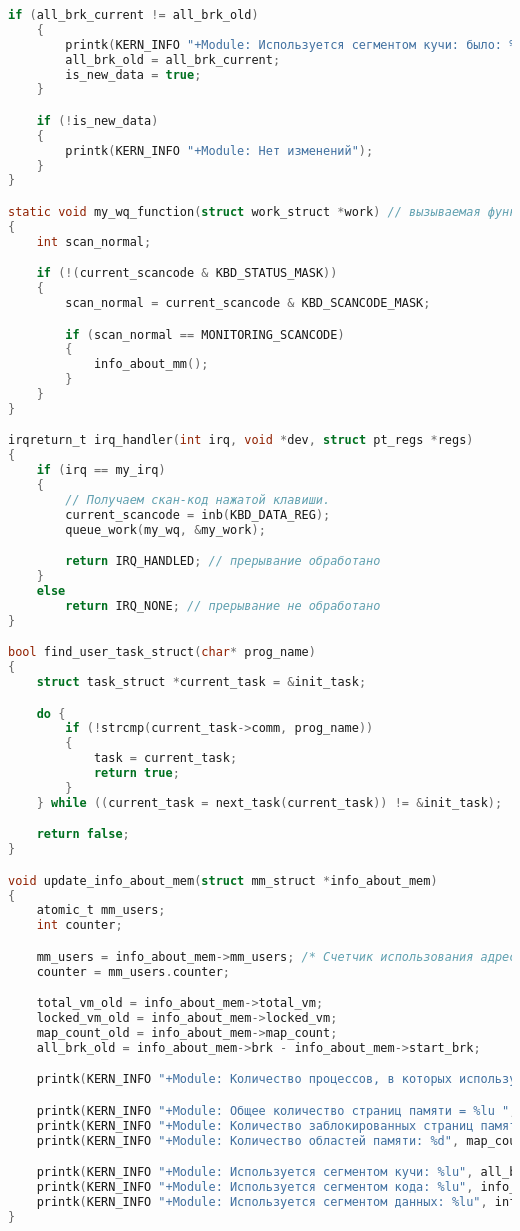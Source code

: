 \begin{lstlisting}[language=c, label=some-code, caption=Загружаемый модуль ядра]
	if (all_brk_current != all_brk_old)
	{
		printk(KERN_INFO "+Module: Используется сегментом кучи: было: %lu; стало:%lu; разница:%lu", all_brk_old, all_brk_current, all_brk_current - all_brk_old);
		all_brk_old = all_brk_current;
		is_new_data = true;
	}

	if (!is_new_data)
	{
		printk(KERN_INFO "+Module: Нет изменений");
	}
}

static void my_wq_function(struct work_struct *work) // вызываемая функция
{
	int scan_normal;

	if (!(current_scancode & KBD_STATUS_MASK))
	{
		scan_normal = current_scancode & KBD_SCANCODE_MASK;

		if (scan_normal == MONITORING_SCANCODE)
		{
			info_about_mm();
		}
	}
}

irqreturn_t irq_handler(int irq, void *dev, struct pt_regs *regs)
{
	if (irq == my_irq)
	{		
		// Получаем скан-код нажатой клавиши.
		current_scancode = inb(KBD_DATA_REG);
		queue_work(my_wq, &my_work);

		return IRQ_HANDLED; // прерывание обработано
	}
	else
		return IRQ_NONE; // прерывание не обработано
}

bool find_user_task_struct(char* prog_name)
{
	struct task_struct *current_task = &init_task;

	do {
		if (!strcmp(current_task->comm, prog_name))
		{
			task = current_task;
			return true;
		}
	} while ((current_task = next_task(current_task)) != &init_task);

	return false;
}

void update_info_about_mem(struct mm_struct *info_about_mem)
{
	atomic_t mm_users; 
	int counter;

	mm_users = info_about_mem->mm_users; /* Счетчик использования адресного пространства */
	counter = mm_users.counter;

	total_vm_old = info_about_mem->total_vm;
	locked_vm_old = info_about_mem->locked_vm;
	map_count_old = info_about_mem->map_count;
	all_brk_old = info_about_mem->brk - info_about_mem->start_brk;

	printk(KERN_INFO "+Module: Количество процессов, в которых используется данное адресное пространство: %d", counter);

	printk(KERN_INFO "+Module: Общее количество страниц памяти = %lu ", total_vm_old);
	printk(KERN_INFO "+Module: Количество заблокированных страниц памяти = %lu ", locked_vm_old);
	printk(KERN_INFO "+Module: Количество областей памяти: %d", map_count_old);

	printk(KERN_INFO "+Module: Используется сегментом кучи: %lu", all_brk_old);
	printk(KERN_INFO "+Module: Используется сегментом кода: %lu", info_about_mem->end_code - info_about_mem->start_code);
	printk(KERN_INFO "+Module: Используется сегментом данных: %lu", info_about_mem->end_data - info_about_mem->start_data);
}



\end{lstlisting}
